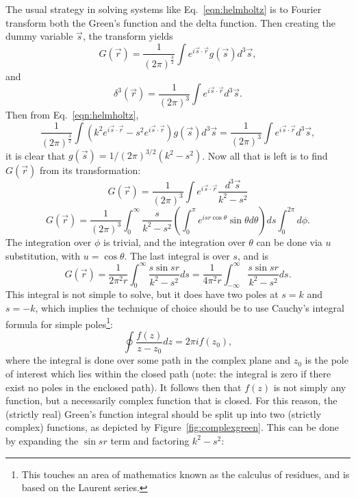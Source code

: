 The usual strategy in solving systems like Eq.~\eqref{eqn:helmholtz} is to Fourier transform both the Green's function and the delta function. Then creating the dummy variable $\vec{s}$, the transform yields
%
\begin{equation} \nonumber
G(\vec{r})=\frac{1}{(2\pi)^\frac{3}{2}}\int e^{i\vec{s}\cdot\vec{r}} g(\vec{s})d^3\vec{s},
\end{equation}
and
%
\begin{equation} \nonumber
\delta^3(\vec{r})=\frac{1}{(2\pi)^3}\int e^{i\vec{s}\cdot\vec{r}} d^3\vec{s}.
\end{equation}
Then from Eq.~\eqref{eqn:helmholtz},
%
\begin{equation} \nonumber
\frac{1}{(2\pi)^\frac{3}{2}}\int (k^2e^{i\vec{s}\cdot\vec{r}}-s^2e^{i\vec{s}\cdot\vec{r}})g(\vec{s})d^3\vec{s}=\frac{1}{(2\pi)^3}\int e^{i\vec{s}\cdot\vec{r}}d^3\vec{s},
\end{equation}
it is clear that $g(\vec{s})=1/(2\pi)^{3/2}(k^2-s^2)$. Now all that is left is to find $G(\vec{r})$ from its transformation:
%
\begin{equation} \nonumber
G(\vec{r})=\frac{1}{(2\pi)^3}\int e^{i\vec{s}\cdot\vec{r}}\frac{d^3\vec{s}}{k^2-s^2}
\end{equation}
%
\begin{equation} \nonumber
G(\vec{r})=\frac{1}{(2\pi)^3}\int_0^\infty \frac{s}{k^2-s^2} \left(\int_0^\pi e^{isr\cos\theta}\sin\theta d\theta\right)ds \int_0^{2\pi}d\phi.
\end{equation}
The integration over $\phi$ is trivial, and the integration over $\theta$ can be done via $u$ substitution, with $u=\cos\theta$. The last integral is over $s$, and is
%
\begin{equation} \nonumber
G(\vec{r})=\frac{1}{2\pi^2r}\int_0^\infty\frac{s\sin{sr}}{k^2-s^2}ds=\frac{1}{4\pi^2r}\int_{-\infty}^\infty\frac{s\sin{sr}}{k^2-s^2}ds.
\end{equation}
This integral is not simple to solve, but it does have two poles at $s=k$ and $s=-k$, which implies the technique of choice should be to use Cauchy's integral formula for simple poles\footnote{This touches an area of mathematics known as the calculus of residues, and is based on the Laurent series.}:
%
\begin{equation}
\label{eqn:cauchy}
\oint \frac{f(z)}{z-z_0}dz=2\pi if(z_0),
\end{equation}
where the integral is done over some path in the complex plane and $z_0$ is the pole of interest which lies within the closed path (note: the integral is zero if there exist no poles in the enclosed path). It follows then that $f(z)$ is not simply any function, but a necessarily complex function that is closed. For this reason, the (strictly real) Green's function integral should be split up into two (strictly complex) functions, as depicted by Figure~\ref{fig:complexgreen}. This can be done by expanding the $\sin sr$ term and factoring $k^2-s^2$:
